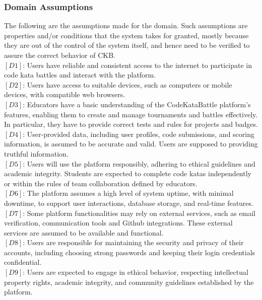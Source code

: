 \subsubsection{Domain Assumptions}
The following are the assumptions made for the domain. Such assumptions are properties and/or conditions that the system takes for granted, mostly because they are out of the control of the system itself, and hence need to be verified to assure the correct behavior of CKB.
\\$[D1]$: Users have reliable and consistent access to the internet to participate in code kata battles and interact with the platform.
\\$[D2]$: Users have access to suitable devices, such as computers or mobile devices, with compatible web browsers.
\\$[D3]$: Educators have a basic understanding of the CodeKataBattle platform's features, enabling them to create and manage tournaments and battles effectively. In particular, they have to provide correct tests and rules for projects and badges.
\\$[D4]$: User-provided data, including user profiles, code submissions, and scoring information, is assumed to be accurate and valid. Users are supposed to providing truthful information.
\\$[D5]$: Users will use the platform responsibly, adhering to ethical guidelines and academic integrity. Students are expected to complete code katas independently or within the rules of team collaboration defined by educators.
\\$[D6]$: The platform assumes a high level of system uptime, with minimal downtime, to support user interactions, database storage, and real-time features.
\\$[D7]$: Some platform functionalities may rely on external services, such as email verification, communication tools and Github integrations. These external services are assumed to be available and functional.
\\$[D8]$: Users are responsible for maintaining the security and privacy of their accounts, including choosing strong passwords and keeping their login credentials confidential.
\\$[D9]$: Users are expected to engage in ethical behavior, respecting intellectual property rights, academic integrity, and community guidelines established by the platform.